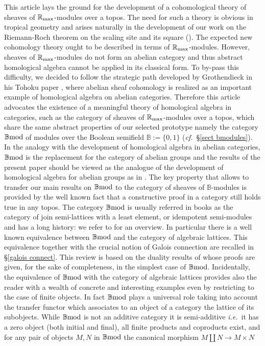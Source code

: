 \documentclass[12pt]{article}
\def\B{{\mathbb B}}
\def\R{{\mathbb R}}
\newcommand{\ie}{{\it i.e.\/}\ }
\newcommand{\cf}{{\it cf.}}
\def\rma{\R_{\rm max}}
\def\bmod{{\rm \B mod}}
\begin{document}
This article lays the ground for the development of a cohomological theory of sheaves of $\rma$-modules over a topos. The need for such a theory is obvious in tropical geometry and arises naturally in the development of our work on the Riemann-Roch theorem on the scaling site and its square (\!\!\cite{CCss, CCss1}).  The expected new cohomology theory  ought to be described in terms of $\rma$-modules. However, sheaves of $\rma$-modules do not form an abelian category and thus abstract homological algebra cannot be applied in its classical form. To by-pass this difficulty, we decided to follow the strategic path developed by Grothendieck in his Tohoku paper \cite{Grtohoku}, where abelian sheaf cohomology is realized as an important example of homological algebra on abelian categories. Therefore this article advocates the existence of a meaningful theory of homological algebra in categories, such as the category of  sheaves of $\rma$-modules over a topos, which share the same abstract properties of our selected prototype namely the category $\bmod$ of modules over the Boolean semifield $\B:=\{0,1\}$ (\cf~\S\ref{sect bmodules}). In the analogy with the development of homological algebra in abelian categories, $\bmod$ is the replacement for the category of abelian groups and the results of the present paper should be viewed as the analogue of the development of homological algebra for abelian groups as in \cite{CE}. The key property that allows to transfer our main results on $\bmod$ to the category of sheaves of $\B$-modules is provided by the well known fact that a constructive proof in a category still holds true in any topos. \newline
The category $\bmod$ is usually referred in books as the category of join semi-lattices with a least element, or idempotent semi-modules and has a long history: we refer to \cite{Cohen} for an overview. In particular there is a well known equivalence between $\bmod$ and the category of algebraic lattices. This equivalence together with the crucial notion of Galois connection are recalled in \S\ref{galois connect}. This review is based on the duality results of \cite{Cohen} whose proofs are given, for the sake of completeness, in the simplest case of $\bmod$. Incidentally, the equivalence of $\bmod$ with the category of algebraic lattices provides also the reader with a wealth of concrete and interesting examples even by restricting to the case of finite objects. In fact  $\bmod$ plays a universal role taking into account the transfer functor \cite{gra1} which associates to an object of a category the lattice of its subobjects.  \newline While $\bmod$ is not an additive category it is  semi-additive \ie  it has a zero object (both initial and final), all finite products and coproducts exist,  and for any pair of objects $M,N$ in $\bmod$ the canonical morphism $M \amalg N\to M\times N$
\end{document}
